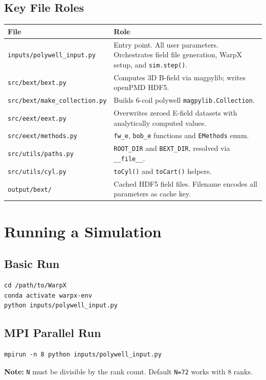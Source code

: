 \documentclass[11pt, a4paper]{article}
\begin{document}
\subsection*{Key File Roles}

\begin{longtable}{L{5.5cm} L{8.5cm}}
\toprule
\textbf{File} & \textbf{Role} \\
\midrule
\texttt{inputs/polywell\_input.py} &
    Entry point. All user parameters. Orchestrates field file generation,
    WarpX setup, and \texttt{sim.step()}. \\[0.3em]
\texttt{src/bext/bext.py} &
    Computes 3D B-field via magpylib; writes openPMD HDF5. \\[0.3em]
\texttt{src/bext/make\_collection.py} &
    Builds 6-coil polywell \texttt{magpylib.Collection}. \\[0.3em]
\texttt{src/eext/eext.py} &
    Overwrites zeroed E-field datasets with analytically computed values. \\[0.3em]
\texttt{src/eext/methods.py} &
    \texttt{fw\_e}, \texttt{bob\_e} functions and \texttt{EMethods} enum. \\[0.3em]
\texttt{src/utils/paths.py} &
    \texttt{ROOT\_DIR} and \texttt{BEXT\_DIR}, resolved via \texttt{\_\_file\_\_}. \\[0.3em]
\texttt{src/utils/cyl.py} &
    \texttt{toCyl()} and \texttt{toCart()} helpers. \\[0.3em]
\texttt{output/bext/} &
    Cached HDF5 field files. Filename encodes all parameters as cache key. \\
\bottomrule
\end{longtable}

\section{Running a Simulation}

\subsection{Basic Run}
\begin{lstlisting}[style=bash]
cd /path/to/WarpX
conda activate warpx-env
python inputs/polywell_input.py
\end{lstlisting}

\subsection{MPI Parallel Run}
\begin{lstlisting}[style=bash]
mpirun -n 8 python inputs/polywell_input.py
\end{lstlisting}
\textbf{Note:} \texttt{N} must be divisible by the rank count. Default \texttt{N=72}
works with 8 ranks.
\end{document}
